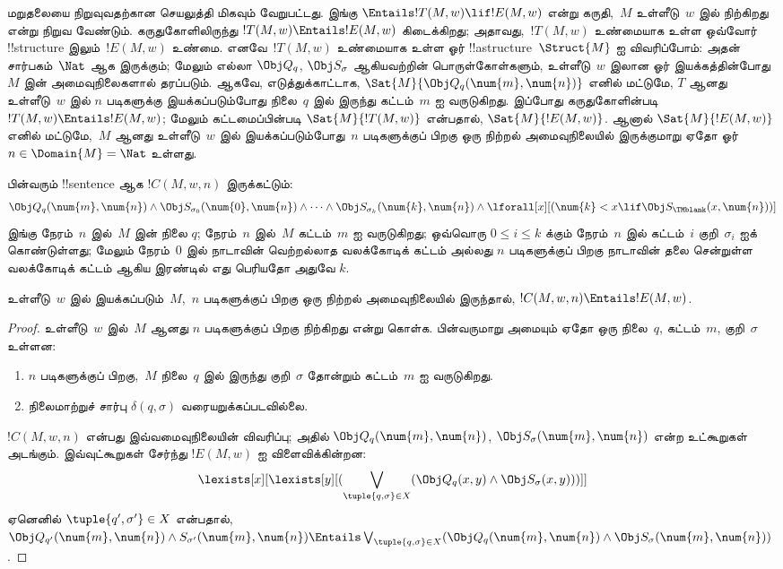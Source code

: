 \documentclass[../../../include/open-logic-section]{subfiles}
\begin{document}
\begin{explain}
மறுதலையை நிறுவுவதற்கான செயலுத்தி மிகவும் வேறுபட்டது. இங்கு
$\Entails !T(M, w) \lif !E(M, w)$ என்று கருதி,~$M$ உள்ளீடு~$w$ இல்
நிற்கிறது என்று நிறுவ வேண்டும். கருதுகோளிலிருந்து
$!T(M, w) \Entails !E(M, w)$ கிடைக்கிறது; அதாவது,~$!T(M, w)$ உண்மையாக
உள்ள ஒவ்வோர் !!{structure} இலும்~$!E(M, w)$ உண்மை. எனவே~$!T(M, w)$
உண்மையாக உள்ள ஓர் !!a{structure}~$\Struct{M}$ ஐ விவரிப்போம்: அதன்
சார்பகம்~$\Nat$ ஆக இருக்கும்; மேலும் எல்லா $\Obj Q_q$,
$\Obj S_\sigma$ ஆகியவற்றின் பொருள்கோள்களும், உள்ளீடு~$w$ இலான ஓர்
இயக்கத்தின்போது~$M$ இன் அமைவுநிலைகளால் தரப்படும். ஆகவே,
எடுத்துக்காட்டாக, $\Sat{M}{\Obj Q_q(\num{m}, \num{n})}$ எனில் மட்டுமே,
$T$ ஆனது உள்ளீடு~$w$ இல் $n$ படிகளுக்கு இயக்கப்படும்போது நிலை~$q$
இல் இருந்து கட்டம்~$m$ ஐ வருடுகிறது. இப்போது கருதுகோளின்படி
$!T(M, w) \Entails !E(M, w)$; மேலும் கட்டமைப்பின்படி
$\Sat{M}{!T(M, w)}$ என்பதால், $\Sat{M}{!E(M, w)}$. ஆனால்
$\Sat{M}{!E(M, w)}$ எனில் மட்டுமே,~$M$ ஆனது உள்ளீடு~$w$ இல்
இயக்கப்படும்போது~$n$ படிகளுக்குப் பிறகு ஒரு நிற்றல் அமைவுநிலையில்
இருக்குமாறு ஏதோ ஓர் $n \in \Domain{M} = \Nat$ உள்ளது.
\end{explain}

\begin{defn} 
பின்வரும் !!{sentence} ஆக $!C(M, w, n)$ இருக்கட்டும்:
\[ 
\Obj Q_q(\num{m}, \num{n}) \land \Obj S_{\sigma_0}(\num{0}, \num{n})
\land \dots \land \Obj S_{\sigma_k}(\num{k}, \num{n}) \land
\lforall[x][(\num{k} < x \lif \Obj S_\TMblank(x, \num{n}))]
\] 
இங்கு நேரம்~$n$ இல்~$M$ இன் நிலை $q$; நேரம்~$n$ இல்~$M$ கட்டம்~$m$
ஐ வருடுகிறது; ஒவ்வொரு $0 \le i \le k$ க்கும் நேரம்~$n$ இல்
கட்டம்~$i$ குறி~$\sigma_i$ ஐக் கொண்டுள்ளது; மேலும் நேரம்~$0$ இல்
நாடாவின் வெற்றல்லாத வலக்கோடிக் கட்டம் அல்லது $n$ படிகளுக்குப் பிறகு
நாடாவின் தலை சென்றுள்ள வலக்கோடிக் கட்டம் ஆகிய இரண்டில் எது பெரியதோ
அதுவே $k$.
\end{defn}

\begin{lem}
உள்ளீடு~$w$ இல் இயக்கப்படும்~$M$,~$n$ படிகளுக்குப் பிறகு ஒரு
நிற்றல் அமைவுநிலையில் இருந்தால்,
$!C(M, w, n) \Entails !E(M, w)$.
\end{lem}

\begin{proof}
உள்ளீடு~$w$ இல்~$M$ ஆனது $n$ படிகளுக்குப் பிறகு நிற்கிறது என்று கொள்க.
பின்வருமாறு அமையும் ஏதோ ஒரு நிலை~$q$, கட்டம்~$m$, குறி~$\sigma$ உள்ளன:
\begin{enumerate} 
\item $n$ படிகளுக்குப் பிறகு,~$M$ நிலை~$q$ இல் இருந்து
  குறி~$\sigma$ தோன்றும் கட்டம்~$m$ ஐ வருடுகிறது.
\item நிலைமாற்றுச் சார்பு $\delta(q, \sigma)$ வரையறுக்கப்படவில்லை.
\end{enumerate}
$!C(M, w, n)$ என்பது இவ்வமைவுநிலையின் விவரிப்பு; அதில்
$\Obj Q_{q}(\num{m}, \num{n})$, $\Obj
S_{\sigma}(\num{m}, \num{n})$ என்ற உட்கூறுகள் அடங்கும். இவ்வுட்கூறுகள்
சேர்ந்து $!E(M, w)$ ஐ விளைவிக்கின்றன:
\[
\lexists[x][\lexists[y][(\bigvee_{\tuple{q, \sigma} \in
      X}(\Obj Q_q(x, y) \land \Obj S_\sigma(x, y)))]]
\]
ஏனெனில் $\tuple{q',\sigma'} \in X$ என்பதால்,
$\Obj Q_{q'}(\num{m}, \num{n}) \land S_{\sigma'}(\num{m},
\num{n}) \Entails \bigvee_{\tuple{q, \sigma} \in X} (\Obj Q_q(\num{m},
\num{n}) \land \Obj S_{\sigma}(\num{m}, \num{n}))$.
\end{proof}
\end{document}
